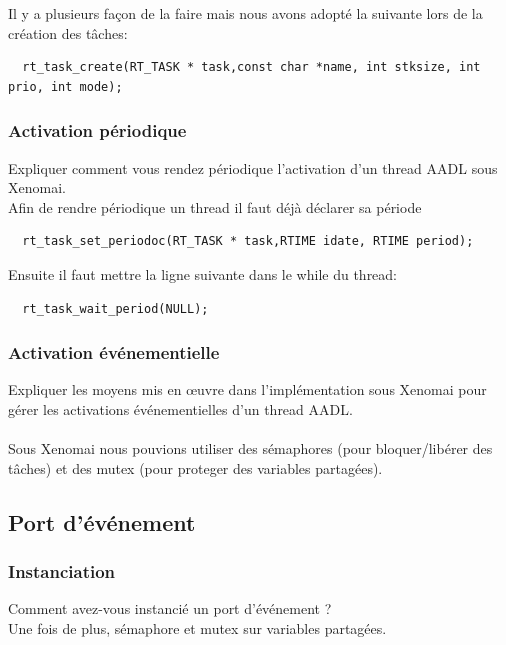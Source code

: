 \documentclass[11pt, a4paper]{paper}
\begin{document}
{{{{\color{black} Il y a plusieurs façon de la faire mais nous avons adopté la suivante lors de la création des tâches: }
\begin{verbatim}
  rt_task_create(RT_TASK * task,const char *name, int stksize, int prio, int mode);
\end{verbatim}

\subsubsection{Activation périodique}
 {\color{blue} Expliquer comment vous rendez périodique l'activation d'un thread AADL sous Xenomai.}\\
 
{\color{black} Afin de rendre périodique un thread il faut déjà déclarer sa période}
\begin{verbatim}
  rt_task_set_periodoc(RT_TASK * task,RTIME idate, RTIME period);
\end{verbatim}
{\color{black} Ensuite il faut mettre la ligne suivante dans le while du thread:}
\begin{verbatim}
  rt_task_wait_period(NULL);
\end{verbatim}

\subsubsection{Activation événementielle}
 {\color{blue} Expliquer les moyens mis en {\oe}uvre dans l'implémentation sous Xenomai pour gérer les activations événementielles d'un thread AADL.}\\ \\
{\color{black} Sous Xenomai nous pouvions utiliser des sémaphores (pour bloquer/libérer des tâches) et des mutex (pour proteger des variables partagées).}
 
\subsection{Port d’événement}

\subsubsection{Instanciation}
 {\color{blue} Comment avez-vous instancié un port d'événement ?}\\
 
 {\color{black} Une fois de plus, sémaphore et mutex sur variables partagées.}
 
}}}
\end{document}
